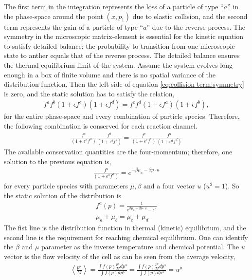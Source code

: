 The first term in the integration represents the loss of a particle of type ``$a$'' in the phase-space around the point $(x, p_1)$ due to elastic collision, and the second term represents the gain of a particle of type ``$a$'' due to the reverse process.
The symmetry in the microscopic matrix-element is essential for the kinetic equation to satisfy detailed balance: the probability to transition from one microscopic state to anther equals that of the reverse process.
The detailed balance ensures the thermal equilibrium limit of the system. 
Assume the system evolves long enough in a box of finite volume and there is no spatial variance of the distribution function.
Then the left side of equation \ref{eq:collision-term:symmetry} is zero, and the static solution has to satisfy the relation,
\begin{eqnarray}
f^a f^b (1+\epsilon f^c) (1+\epsilon f^d) = f^c f^d (1+\epsilon f^a) (1+\epsilon f^b),
\end{eqnarray}
for the entire phase-space and every combination of particle species.
Therefore, the following combination is conserved for each reaction channel.
 \begin{eqnarray}
\frac{f^a}{(1+\epsilon^a f^a)} \frac{f^b}{(1+\epsilon^b f^b)}
= \frac{f^c}{(1+\epsilon^c f^c)} \frac{f^d}{(1+\epsilon^d f^d)}
\end{eqnarray}
The available conservation quantities are the four-momentum; therefore, one solution to the previous equation is,
\begin{eqnarray}
\frac{f^a}{(1+\epsilon^a f^a)} = e^{-\beta \mu_a-\beta p\cdot u}
\end{eqnarray}
for every particle species with parameters $\mu, \beta$ and a four vector $u$ ($u^2 = 1$). 
So the static solution of the distribution is 
\begin{eqnarray}
f^a(p) = \frac{1}{ e^{\beta \mu_a+\beta p\cdot u} - \epsilon^a} \label{eq:thermal}\\
\mu_a +\mu_b = \mu_c + \mu_d \label{eq:chem}
\end{eqnarray}
The fist line is the distribution function in thermal (kinetic) equilibrium, and the second line is the requirement for reaching chemical equilibrium. 
One can identify the $\beta$ and $\mu$ parameter as the inverse temperature and chemical potential. The $u$ vector is the flow velocity of the cell as can be seen from the average velocity,
\begin{eqnarray}
\left\langle \frac{p^\mu}{M} \right\rangle = \frac{\int f(p) \frac{p^\mu}{M} dp^3}{\int f(p) dp^3} = \frac{\int f(p) \frac{p^\mu}{M} dp^3}{\int f(p) dp^3} = u^\mu
\end{eqnarray}

